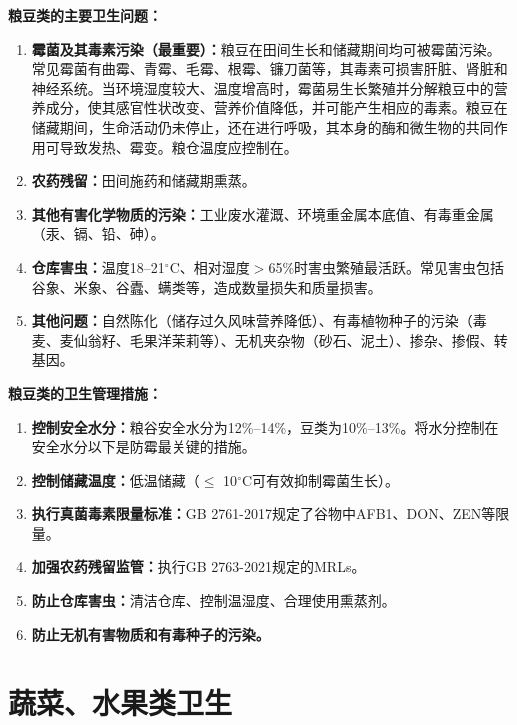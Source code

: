 \begin{keybox}
\textbf{粮豆类的主要卫生问题：}
\begin{enumerate}[leftmargin=*]
    \item \textbf{霉菌及其毒素污染（最重要）：}粮豆在田间生长和储藏期间均可被霉菌污染。常见霉菌有曲霉、青霉、毛霉、根霉、镰刀菌等，其毒素可损害肝脏、肾脏和神经系统。当环境湿度较大、温度增高时，霉菌易生长繁殖并分解粮豆中的营养成分，使其感官性状改变、营养价值降低，并可能产生相应的毒素。粮豆在储藏期间，生命活动仍未停止，还在进行呼吸，其本身的酶和微生物的共同作用可导致发热、霉变。粮仓温度应控制在。
    \item \textbf{农药残留：}田间施药和储藏期熏蒸。
    \item \textbf{其他有害化学物质的污染：}工业废水灌溉、环境重金属本底值、有毒重金属（汞、镉、铅、砷）。
    \item \textbf{仓库害虫：}温度18--21$^\circ$C、相对湿度$>$65\%时害虫繁殖最活跃。常见害虫包括谷象、米象、谷蠹、螨类等，造成数量损失和质量损害。
    \item \textbf{其他问题：}自然陈化（储存过久风味营养降低）、有毒植物种子的污染（毒麦、麦仙翁籽、毛果洋茉莉等）、无机夹杂物（砂石、泥土）、掺杂、掺假、转基因。
\end{enumerate}

\textbf{粮豆类的卫生管理措施：}
\begin{enumerate}[leftmargin=*]
    \item \textbf{控制安全水分：}粮谷安全水分为12\%--14\%，豆类为10\%--13\%。将水分控制在安全水分以下是防霉最关键的措施。
    \item \textbf{控制储藏温度：}低温储藏（$\leq$ 10$^\circ$C可有效抑制霉菌生长）。
    \item \textbf{执行真菌毒素限量标准：}GB 2761-2017规定了谷物中AFB1、DON、ZEN等限量。
    \item \textbf{加强农药残留监管：}执行GB 2763-2021规定的MRLs。
    \item \textbf{防止仓库害虫：}清洁仓库、控制温湿度、合理使用熏蒸剂。
    \item \textbf{防止无机有害物质和有毒种子的污染。}
\end{enumerate}
\end{keybox}

\section{蔬菜、水果类卫生}

